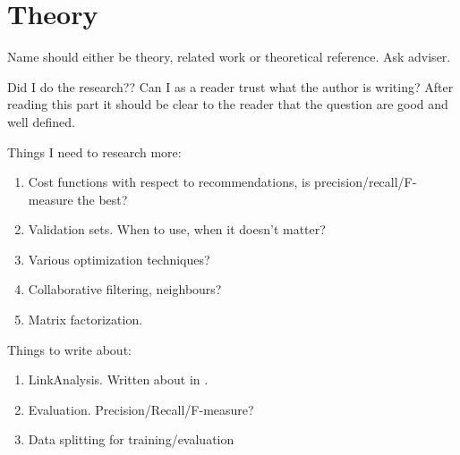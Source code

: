 

\chapter{Theory}\label{cha:theory}

Name should either be theory, related work or theoretical reference. Ask adviser.

Did I do the research?? Can I as a reader trust what the author is writing? After reading this part it should be clear to the reader that the question are good and well defined.

Things I need to research more:

\begin{enumerate}
    \item Cost functions with respect to recommendations, is precision/recall/F-measure the best?
    \item Validation sets. When to use, when it doesn't matter?
    \item Various optimization techniques?
    \item Collaborative filtering, neighbours? \cite{Yifan:2008}
    \item Matrix factorization.
\end{enumerate}

Things to write about:

\begin{enumerate}
    \item LinkAnalysis. Written about in \cite{Zan:2007}.
    \item Evaluation. Precision/Recall/F-measure?
    \item Data splitting for training/evaluation
\end{enumerate}
